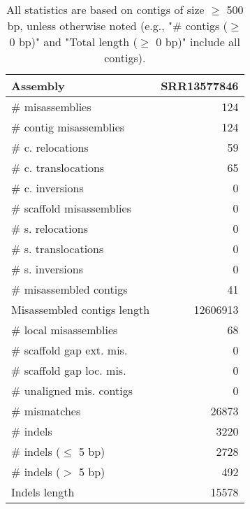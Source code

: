 \documentclass[12pt,a4paper]{article}
\begin{document}
\begin{table}[ht]
\begin{center}
\caption{All statistics are based on contigs of size $\geq$ 500 bp, unless otherwise noted (e.g., "\# contigs ($\geq$ 0 bp)" and "Total length ($\geq$ 0 bp)" include all contigs).}
\begin{tabular}{|l*{1}{|r}|}
\hline
Assembly & SRR13577846 \\ \hline
\# misassemblies & 124 \\ \hline
\hspace{2mm}\# contig misassemblies & 124 \\ \hline
\hspace{5mm}\# c. relocations & 59 \\ \hline
\hspace{5mm}\# c. translocations & 65 \\ \hline
\hspace{5mm}\# c. inversions & 0 \\ \hline
\hspace{2mm}\# scaffold misassemblies & 0 \\ \hline
\hspace{5mm}\# s. relocations & 0 \\ \hline
\hspace{5mm}\# s. translocations & 0 \\ \hline
\hspace{5mm}\# s. inversions & 0 \\ \hline
\# misassembled contigs & 41 \\ \hline
Misassembled contigs length & 12606913 \\ \hline
\# local misassemblies & 68 \\ \hline
\# scaffold gap ext. mis. & 0 \\ \hline
\# scaffold gap loc. mis. & 0 \\ \hline
\# unaligned mis. contigs & 0 \\ \hline
\# mismatches & 26873 \\ \hline
\# indels & 3220 \\ \hline
\hspace{5mm}\# indels ($\leq$ 5 bp) & 2728 \\ \hline
\hspace{5mm}\# indels ($>$ 5 bp) & 492 \\ \hline
Indels length & 15578 \\ \hline
\end{tabular}
\end{center}
\end{table}
\end{document}

